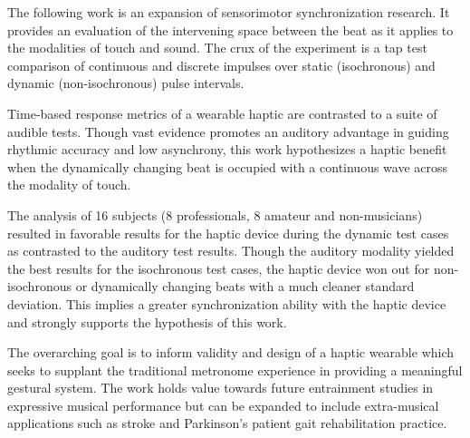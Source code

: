 
\setlength{\parskip}{1em}
\setlength{\parindent}{0em}

\noindent

The following work is an expansion of sensorimotor synchronization research. It provides an evaluation of the intervening space between the beat as it applies to the modalities of touch and sound. The crux of the experiment is a tap test comparison of continuous and discrete impulses over static (isochronous) and dynamic (non-isochronous) pulse intervals. 

Time-based response metrics of a wearable haptic are contrasted to a suite of audible tests. Though vast evidence promotes an auditory advantage in guiding rhythmic accuracy and low asynchrony, this work hypothesizes a haptic benefit when the dynamically changing beat is occupied with a continuous wave across the modality of touch. 

The analysis of 16 subjects (8 professionals, 8 amateur and non-musicians) resulted in favorable results for the haptic device during the dynamic test cases as contrasted to the auditory test results. Though the auditory modality yielded the best results for the isochronous test cases, the haptic device won out for non-isochronous or dynamically changing beats with a much cleaner standard deviation. This implies a greater synchronization ability with the haptic device and strongly supports the hypothesis of this work.

The overarching goal is to inform validity and design of a haptic wearable which seeks to supplant the traditional metronome experience in providing a meaningful gestural system. The work holds value towards future entrainment studies in expressive musical performance but can be expanded to include extra-musical applications such as stroke and Parkinson's patient gait rehabilitation practice.
